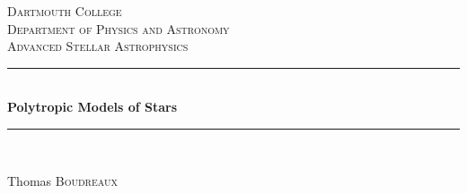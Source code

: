 \begin{titlepage}

\newcommand{\HRule}{\rule{\linewidth}{0.5mm}} %

\center %
 

\textsc{\LARGE Dartmouth College}\\[1.5cm] %
\textsc{\Large Department of Physics and Astronomy}\\[0.5cm] %
\textsc{\large Advanced Stellar Astrophysics}\\[0.5cm] %


\HRule \\[0.4cm]
{ \huge \bfseries Polytropic Models of Stars}\\[0.4cm] %
\HRule \\[1.5cm]
 

\begin{minipage}{0.4\textwidth}
\begin{flushleft} \large
\begin{center}
Thomas \textsc{Boudreaux} %
\end{center}
\end{flushleft}
\end{minipage}
~


\end{titlepage}
